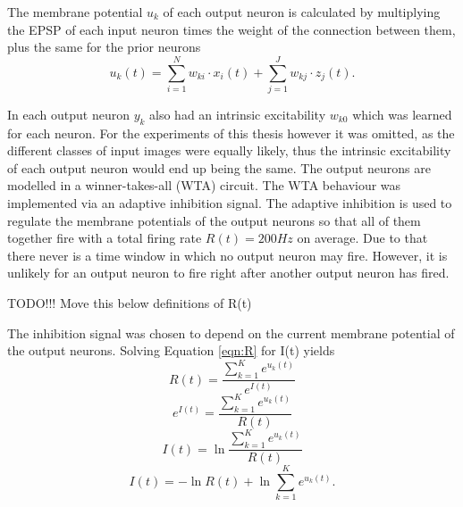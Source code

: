 The membrane potential $u_k$ of each output neuron is calculated by multiplying the EPSP of each input neuron times the weight of the connection between them, plus the same for the prior neurons
\begin{equation}
\label{eqn:uk}
u_k(t) = \sum_{i=1}^N w_{ki} \cdot x_i(t) + \sum_{j=1}^J w_{kj} \cdot z_j(t).
\end{equation}

In \citet{nessler} each output neuron $y_k$ also had an intrinsic excitability $w_{k0}$ which was learned for each neuron. For the experiments of this thesis however it was omitted, as the different classes of  input images were equally likely, thus the intrinsic excitability of each output neuron would end up being the same.
The output neurons are modelled in a winner-takes-all (WTA) circuit. The WTA behaviour was implemented via an adaptive inhibition signal. The adaptive inhibition is used to regulate
the membrane potentials of the output neurons so that all of them together fire with a total firing rate $R(t) = 200 Hz$ on average. Due to that there never is a time window in which no output neuron may fire. However, it is unlikely for an output neuron to fire right after another output neuron has fired.

TODO!!! Move this below definitions of R(t)

The inhibition signal was chosen to depend on the current membrane potential of the output neurons. 
Solving Equation \ref{eqn:R} for I(t) yields
\begin{equation}
\label{}
R(t) = \frac{ \sum_{k=1}^K e^{u_k(t)}}{e^{I(t)}}
\end{equation}
\begin{equation}
\label{}
e^{I(t)} = \frac{\sum_{k=1}^K e^{u_k(t)}}{R(t)}
\end{equation}
\begin{equation}
\label{}
I(t) = \ln{ \frac{ \sum_{k=1}^K e^{u_k(t)}}{R(t)}}
\end{equation}
\begin{equation}
\label{eqn:I(t)}
I(t) =  - \ln{R(t)} + \ln{  \sum_{k=1}^K e^{u_k(t)}}.
\end{equation}

